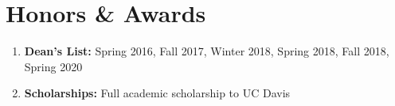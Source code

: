\section{Honors \& Awards}
\vspace{-3mm}
\begin{enumerate}[leftmargin = 0pt, topsep = 0pt, itemsep = 0.000pt, noitemsep ]

\item[] \textbf{Dean's List:} Spring 2016, Fall 2017, Winter 2018, Spring 2018, Fall 2018, Spring 2020

\item[] \textbf{Scholarships:} Full academic scholarship to UC Davis


\end{enumerate}